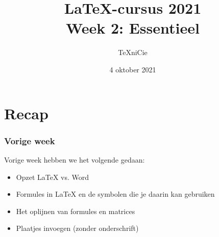 \documentclass{cursuspresentatie}
\title[LaTeX-cursus 2021 -- Week 2]{%
	\texorpdfstring{%
		\LaTeX{}-cursus 2021\\Week 2: Essentieel%
	}{%
		Week 2 -- LaTeX-cursus 2021%
	}%
}
\author{\TeX niCie}
\date{4 oktober 2021}
\begin{document}

\begin{frame}
	\titlepage
	\centering
\end{frame}


	

\clearrecentlist
\def\assetdir{assets}

\section{Recap}

\begin{frame}
    \frametitle{Vorige week}
    Vorige week hebben we het volgende gedaan:
    \begin{itemize}
    \item Opzet \LaTeX{} vs. Word
    \item Formules in \LaTeX{} en de symbolen die je daarin kan gebruiken
    \item Het oplijnen van formules en matrices
    \item Plaatjes invoegen (zonder onderschrift)
    \end{itemize}
\end{frame}
\end{document}
